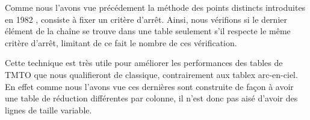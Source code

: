 	Comme nous l'avons vue précédement la méthode des points distincts introduites en 1982 \cite{Rivest}, consiste à fixer un critère d'arrêt. Ainsi, nous vérifions si le dernier élément de la chaîne se trouve dans une table seulement s'il respecte le même critère d'arrêt, limitant de ce fait le nombre de ces vérification.
	
	Cette technique est très utile pour améliorer les performances des tables de TMTO que nous qualifieront de classique, contrairement aux tablex arc-en-ciel. En effet comme nous l'avons vue ces dernières sont construite de façon à avoir une table de réduction différentes par colonne, il n'est donc pas aisé d'avoir des lignes de taille variable.

\endinput{}
